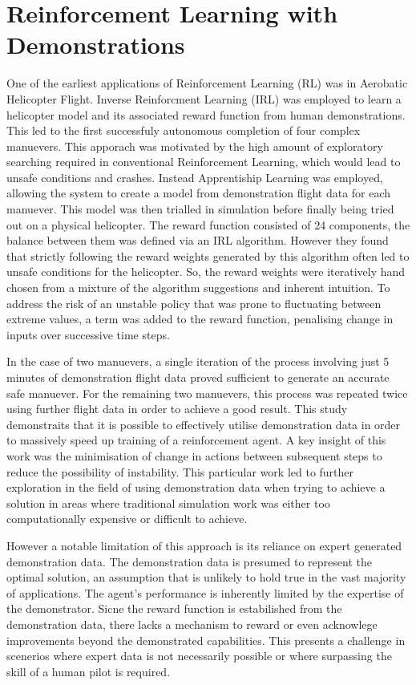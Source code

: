 \section{Reinforcement Learning with Demonstrations}

One of the earliest applications of Reinforcement Learning (RL) was in Aerobatic Helicopter Flight\cite{abbeelRLAerobaticFlight}.
Inverse Reinforcment Learning (IRL) was employed to learn a helicopter model and its associated reward function from human demonstrations.
This led to the first successfuly autonomous completion of four complex manuevers.
This apporach was motivated by the high amount of exploratory searching required in conventional Reinforcement Learning, which would lead to unsafe conditions and crashes.
Instead Apprentiship Learning was employed, allowing the system to create a model from demonstration flight data for each manuever.
This model was then trialled in simulation before finally being tried out on a physical helicopter.
The reward function consisted of 24 components, the balance between them was defined via an IRL algorithm.
However they found that strictly following the reward weights generated by this algorithm often led to unsafe conditions for the helicopter.
So, the reward weights were iteratively hand chosen from a mixture of the algorithm suggestions and inherent intuition. 
To address the risk of an unstable policy that was prone to fluctuating between extreme values, a term was added to the reward function, penalising change in inputs over successive time steps.

In the case of two manuevers, a single iteration of the process involving just 5 minutes of demonstration flight data proved sufficient to generate an accurate safe manuever.
For the remaining two manuevers, this process was repeated twice using further flight data in order to achieve a good result.
This study demonstraits that it is possible to effectively utilise demonstration data in order to massively speed up training of a reinforcement agent.
A key insight of this work was the minimisation of change in actions between subsequent steps to reduce the possibility of instability.
This particular work led to further exploration in the field of using demonstration data when trying to achieve a solution in areas where traditional simulation work was either too computationally expensive or difficult to achieve.

However a notable limitation of this approach is its reliance on expert generated demonstration data.
The demonstration data is presumed to represent the optimal solution, an assumption that is unlikely to hold true in the vast majority of applications.
The agent's performance is inherently limited by the expertise of the demonstrator.
Sicne the reward function is estabilished from the demonstration data, there lacks a mechanism to reward or even acknowlege improvements beyond the demonstrated capabilities.
This presents a challenge in scenerios where expert data is not necessarily possible or where surpassing the skill of a human pilot is required. \\\\


